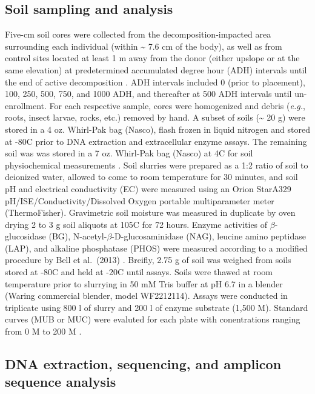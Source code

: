 \documentclass[
  10pt,
  letterpaper,
]{article}
\begin{document}
\subsection{Soil sampling and
analysis}\label{soil-sampling-and-analysis}

Five-cm soil cores were collected from the decomposition-impacted area
surrounding each individual (within \textasciitilde{} 7.6 cm of the
body), as well as from control sites located at least 1 m away from the
donor (either upslope or at the same elevation) at predetermined
accumulated degree hour (ADH) intervals until the end of active
decomposition \citep{mason_body_2022}. ADH intervals included 0 (prior
to placement), 100, 250, 500, 750, and 1000 ADH, and thereafter at 500
ADH intervals until un-enrollment. For each respective sample, cores
were homogenized and debris (\emph{e.g.}, roots, insect larvae, rocks,
etc.) removed by hand. A subset of soils (\textasciitilde{} 20 g) were
stored in a 4 oz. Whirl-Pak bag (Nasco), flash frozen in liquid nitrogen
and stored at -80\textdegree C prior to DNA extraction and extracellular
enzyme assays. The remaining soil was was stored in a 7 oz. Whirl-Pak
bag (Nasco) at 4\textdegree C for soil physiochemical measurements
\citep{mason_body_2022}. Soil slurries were prepared as a 1:2 ratio of
soil to deionized water, allowed to come to room temperature for 30
minutes, and soil pH and electrical conductivity (EC) were measured
using an Orion Star\texttrademark  A329 pH/ISE/Conductivity/Dissolved
Oxygen portable multiparameter meter (ThermoFisher). Gravimetric soil
moisture was measured in duplicate by oven drying 2 to 3 g soil aliquots
at 105\textdegree C for 72 hours. Enzyme activities of
\(\beta\)-glucosidase (BG), N-acetyl-\(\beta\)-D-glucosaminidase (NAG),
leucine amino peptidase (LAP), and alkaline phosphatase (PHOS) were
measured according to a modified procedure by Bell et al.~(2013)
\citep{mason_body_2022, bell_high-throughput_2013}. Breifly, 2.75 g of
soil was weighed from soils stored at -80\textdegree C and held at
-20\textdegree C until assays. Soils were thawed at room temperature
prior to slurrying in 50 mM Tris buffer at pH 6.7 in a blender (Waring
commercial blender, model WF2212114). Assays were conducted in
triplicate using 800 \textmu l of slurry and 200 \textmu l of enzyme
substrate (1,500 \textmu M). Standard curves (MUB or MUC) were evaluted
for each plate with conentrations ranging from 0 \textmu M to 200
\textmu M \citep{mason_body_2022}.

\subsection{DNA extraction, sequencing, and amplicon sequence
analysis}\label{dna-extraction-sequencing-and-amplicon-sequence-analysis}
\end{document}
